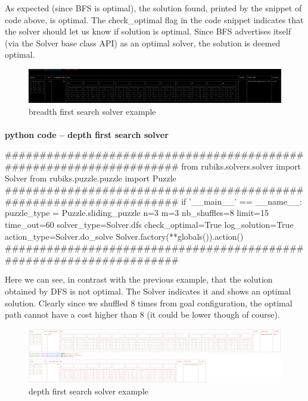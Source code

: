 As expected (since BFS is optimal), the solution found, printed by the snippet of code above, is optimal. The check\_optimal flag in the code snippet indicates that the solver should let us know if solution is optimal. Since BFS advertises itself (via the Solver base class API)  as an optimal solver, the solution is deemed optimal.


\begin{figure}[H]
\centering
\includegraphics[scale=0.25]{./Figures/examplebfssolver}
\caption[Examples]{breadth first search solver example}
\label{fig:examplebfssolver}
\end{figure}

\label{DFSSS}



\afblue
\paragraph{}{\textbf{python code -- depth first search solver}}
\begin{python}
####################################################################
from rubiks.solvers.solver import Solver
from rubiks.puzzle.puzzle import Puzzle
####################################################################
if '__main__' == __name__:
    puzzle_type = Puzzle.sliding_puzzle
    n=3
    m=3
    nb_shuffles=8
    limit=15
    time_out=60
    solver_type=Solver.dfs
    check_optimal=True
    log_solution=True
    action_type=Solver.do_solve
    Solver.factory(**globals()).action()
####################################################################

\end{python}
\black
Here we can see, in contrast with the previous example, that the solution obtained by DFS is not optimal. The Solver indicates it and shows an optimal solution. Clearly since we shuffled 8 times from goal configuration, the optimal path cannot have a cost higher than 8 (it could be lower though of course).

\begin{figure}[H]
\centering
\includegraphics[scale=0.2]{./Figures/exampledfssolver}
\caption[Examples]{depth first search solver example}
\label{fig:exampledfssolver}
\end{figure}


